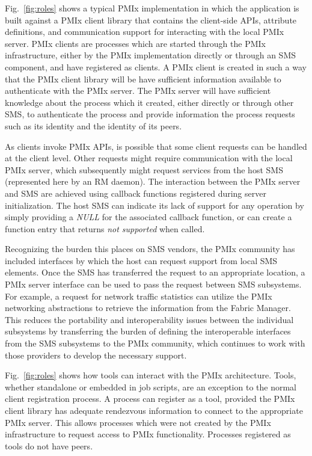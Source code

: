 Fig.~\ref{fig:roles} shows a typical \ac{PMIx} implementation in which the application is 
built against a \ac{PMIx} client library that contains the client-side \acp{API},
attribute definitions, and communication support for interacting with the local \ac{PMIx} server. 
\ac{PMIx} clients are processes which are started through the \ac{PMIx} infrastructure, 
either by the PMIx implementation directly or through an \ac{SMS} component, and have registered 
as clients.  A \ac{PMIx} client 
is created in such a way that the \ac{PMIx} client library
will be have sufficient information available to
authenticate with the \ac{PMIx} server.  
The \ac{PMIx} server will have sufficient knowledge about the  
process which it created, either directly or through other \ac{SMS}, to authenticate the 
process and provide information the process requests such as its identity and the 
identity of its peers.  

As clients invoke \ac{PMIx} \acp{API}, is possible that some client requests can 
be handled at the client level.  Other requests might require communication with the 
local \ac{PMIx} server, which subsequently might request services from the host \ac{SMS} 
(represented here by an \ac{RM} daemon).  The interaction between the \ac{PMIx} server and \ac{SMS} are 
achieved using callback functions registered during server initialization.  
The host \ac{SMS} can indicate its lack of support for any operation by simply providing a \textit{NULL} for the associated callback function, or can create a function entry that returns \textit{not supported} when called.

Recognizing the burden this places on SMS vendors, the PMIx community has included interfaces by
which the host can request support from local SMS elements. Once the \ac{SMS} has transferred the request to
an appropriate location, a \ac{PMIx} server interface can be used to pass the request 
between \ac{SMS} subsystems.
For example, a request for network traffic statistics can utilize the
PMIx networking abstractions to retrieve the information from the Fabric Manager. 
This reduces the portability and
interoperability issues between the individual subsystems by transferring the burden of defining the
interoperable interfaces from the \ac{SMS} subsystems to the \ac{PMIx} community, which continues
to work with those providers to develop the necessary support.

Fig.~\ref{fig:roles} shows how tools can interact with the \ac{PMIx} architecture.
Tools, whether standalone or embedded in job scripts, are an exception to 
the normal client registration process.   A process can register as a tool, provided 
the \ac{PMIx} client library has adequate rendezvous information to connect to the appropriate
\ac{PMIx} server.  This allows processes
which were not created by the PMIx infrastructure to request access to PMIx functionality. 
Processes registered as tools do not have peers.  

